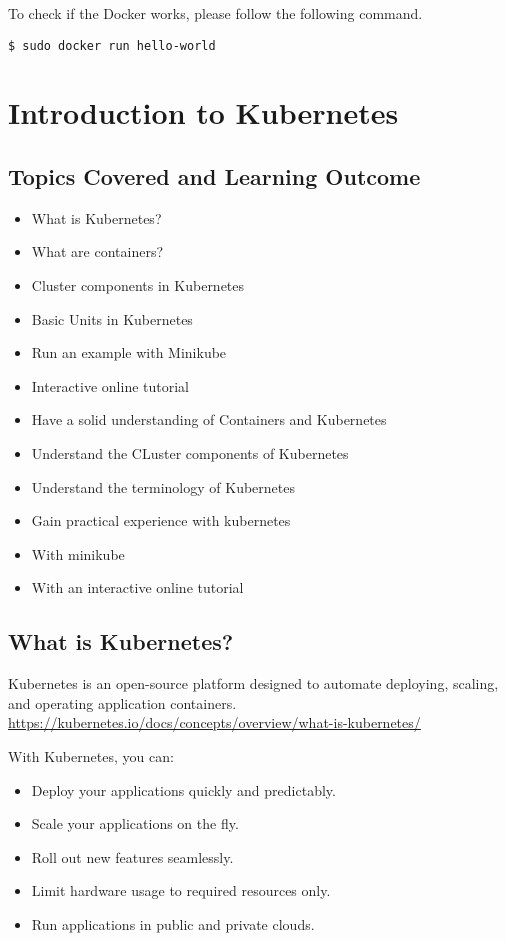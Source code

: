 To check if the Docker works, please follow the following command.

\begin{verbatim}
$ sudo docker run hello-world
\end{verbatim}

\section{Introduction to Kubernetes}\label{introduction-to-kubernetes}

\subsection{Topics Covered and Learning
Outcome}\label{topics-covered-and-learning-outcome-1}

\begin{itemize}

\item
  What is Kubernetes?
\item
  What are containers?
\item
  Cluster components in Kubernetes
\item
  Basic Units in Kubernetes
\item
  Run an example with Minikube
\item
  Interactive online tutorial
\item
  Have a solid understanding of Containers and Kubernetes
\item
  Understand the CLuster components of Kubernetes
\item
  Understand the terminology of Kubernetes
\item
  Gain practical experience with kubernetes
\item
  With minikube
\item
  With an interactive online tutorial
\end{itemize}

\subsection{What is Kubernetes?}\label{what-is-kubernetes}

Kubernetes is an open-source platform designed to automate deploying,
scaling, and operating application containers.
\url{https://kubernetes.io/docs/concepts/overview/what-is-kubernetes/}

With Kubernetes, you can:

\begin{itemize}

\item
  Deploy your applications quickly and predictably.
\item
  Scale your applications on the fly.
\item
  Roll out new features seamlessly.
\item
  Limit hardware usage to required resources only.
\item
  Run applications in public and private clouds.
\end{itemize}


